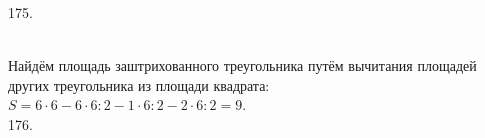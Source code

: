 \documentclass[12pt]{article}
\begin{document}
175. \begin{figure}[ht!]
\end{figure}\\
Найдём площадь заштрихованного треугольника путём вычитания площадей других треугольника из площади квадрата: $S=6\cdot6-6\cdot6:2-1\cdot6:2-2\cdot6:2=9.$\\
176. \begin{figure}[ht!]
\end{figure}\\
\end{document}
